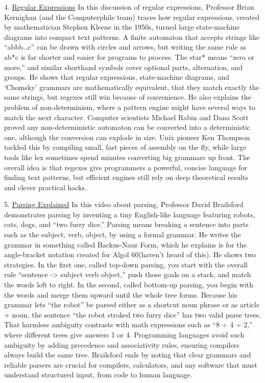 \documentclass{article}
\theoremstyle{theorem}
\theoremstyle{definition}
\theoremstyle{remark}
\begin{document}
4. \href{https://www.youtube.com/watch?v=528Jc3q86F8}{Regular Expressions} \newline
In this discussion of regular expressions, Professor Brian Kernighan (and the Computerphile team) traces how regular expressions, created by mathematician Stephen Kleene in the 1950s, turned large state-machine diagrams into compact text patterns. A finite automaton that accepts strings like “abbb…c” can be drawn with circles and arrows, but writing the same rule as ab*c is far shorter and easier for programs to process. The star* means “zero or more,” and similar shorthand symbols cover optional parts, alternation, and groups. He shows that regular expressions, state-machine diagrams, and ‘Chomsky’ grammars are mathematically equivalent, that they match exactly the same strings, but regexes still win because of convenience. He also explains the problem of non-determinism, where a pattern engine might have several ways to match the next character. Computer scientists Michael Rabin and Dana Scott proved any non-deterministic automaton can be converted into a deterministic one, although the conversion can explode in size. Unix pioneer Ken Thompson tackled this by compiling small, fast pieces of assembly on the fly, while large tools like lex sometimes spend minutes converting big grammars up front. The overall idea is that regexes give programmers a powerful, concise language for finding text patterns, but efficient engines still rely on deep theoretical results and clever practical hacks.

5. \href{https://www.youtube.com/watch?v=bxpc9Pp5pZM}{Parsing Explained} \newline
In this video about parsing, Professor David Brailsford demonstrates parsing by inventing a tiny English-like language featuring robots, cats, dogs, and “two furry dice.” Parsing means breaking a sentence into parts such as the subject, verb, object, by using a formal grammar. He writes the grammar in something called Backus-Naur Form, which he explains is for the angle-bracket notation created for Algol 60(haven’t heard of this). He shows two strategies. In the first one, called top-down parsing, you start with the overall rule “sentence -> subject verb object,” push those goals on a stack, and match the words left to right. In the second, called bottom-up parsing, you begin with the words and merge them upward until the whole tree forms. Because his grammar lets “the robot” be parsed either as a shortcut noun phrase or as article + noun, the sentence “the robot stroked two furry dice” has two valid parse trees. That harmless ambiguity contrasts with math expressions such as “8 ÷ 4 ÷ 2,” where different trees give answers 1 or 4. Programming languages avoid such ambiguity by adding precedence and associativity rules, ensuring compilers always build the same tree. Brailsford ends by noting that clear grammars and reliable parsers are crucial for compilers, calculators, and any software that must understand structured input, from code to human language.
\end{document}
